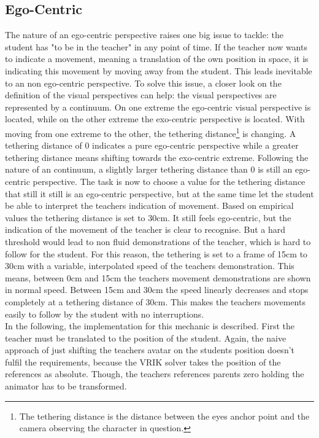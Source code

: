 \subsection{Ego-Centric}
The nature of an ego-centric perspective raises one big issue to tackle: the student has "to be in the teacher" in any point of time. If the teacher now wants to indicate a movement, meaning a translation of the own position in space, it is indicating this movement by moving away from the student. This leads inevitable to an non ego-centric perspective. To solve this issue, a closer look on the definition of the visual perspectives can help: the visual perspectives are represented by a continuum. On one extreme the ego-centric visual perspective is located, while on the other extreme the exo-centric perspective is located. With moving from one extreme to the other, the tethering distance\footnote{The tethering distance is the distance between the eyes anchor point and the camera observing the character in question.} is changing. A tethering distance of 0 indicates a pure ego-centric perspective while a greater tethering distance means shifting towards the exo-centric extreme. Following the nature of an continuum, a slightly larger tethering distance than 0 is still an ego-centric perspective. The task is now to choose a value for the tethering distance that still it still is an ego-centric perspective, but at the same time let the student be able to interpret the teachers indication of movement. 
Based on empirical values the tethering distance is set to 30cm. It still feels ego-centric, but the indication of the movement of the teacher is clear to recognise. But a hard threshold would lead to non fluid demonstrations of the teacher, which is hard to follow for the student. For this reason, the tethering is set to a frame of 15cm to 30cm with a variable, interpolated speed of the teachers demonstration. This means, between 0cm and 15cm the teachers movement demonstrations are shown in normal speed. Between 15cm and 30cm the speed linearly decreases and stops completely at a tethering distance of 30cm. This makes the teachers movements easily to follow by the student with no interruptions.\\
In the following, the implementation for this mechanic is described. First the teacher must be translated to the position of the student. Again, the naive approach of just shifting the teachers avatar on the students position doesn't fulfil the requirements, because the VRIK solver takes the position of the references as absolute. Though, the teachers references parents zero holding the animator has to be transformed.
